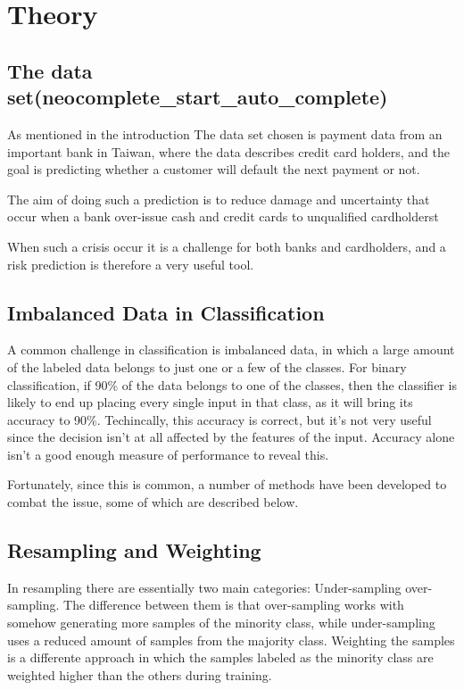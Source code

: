 \section{Theory}
\subsection{The data set(neocomplete_start_auto_complete)}
As mentioned in the introduction The data set chosen is payment data 
from an important bank in Taiwan, where the data describes credit card holders,
and the goal is predicting whether a customer will default the next 
payment or not.

The aim of doing such a prediction is to reduce damage and 
uncertainty that occur when a bank over-issue cash and credit 
cards to unqualified cardholderst ~\cite{ComparisonData}

When such a crisis occur it is a challenge for both banks and 
cardholders, and a risk prediction is therefore a very useful tool. 


\subsection{Imbalanced Data in Classification}
A common challenge in classification is imbalanced data, in which a large
amount of the labeled data belongs to just one or a few of the classes.
For binary classification, if 90\% of the data belongs to one of the classes,
then the classifier is likely to end up placing every single
input in that class, as it will bring its accuracy to 90\%. Techincally, this
accuracy is correct, but it's not very useful since the decision isn't at all
affected by the features of the input. Accuracy alone isn't a good enough
measure of performance to reveal this.

Fortunately, since this is common, a number of methods have been developed
to combat the issue, some of which are described below.

\subsection{Resampling and Weighting}
In resampling there are essentially two main categories: Under-sampling
over-sampling. The difference between them is that over-sampling works with
somehow generating more samples of the minority class, while under-sampling
uses a reduced amount of samples from the majority class.
Weighting the samples is a differente approach in which the samples labeled
as the minority class are weighted higher than the others during training.

